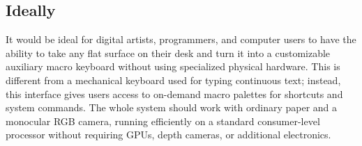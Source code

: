 \subsection{Ideally}
\label{subsec:irca_ideally}
It would be ideal for digital artists, programmers, and computer users to have the ability to take any flat surface on their desk and turn it into a customizable auxiliary macro keyboard without using specialized physical hardware. This is different from a mechanical keyboard used for typing continuous text; instead, this interface gives users access to on-demand macro palettes for shortcuts and system commands. The whole system should work with ordinary paper and a monocular RGB camera, running efficiently on a standard consumer-level processor without requiring GPUs, depth cameras, or additional electronics.

